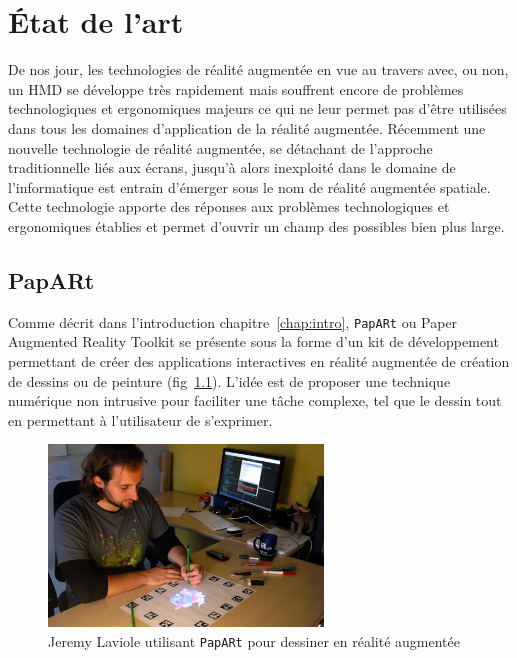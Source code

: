 \chapter{État de l'art}

De nos jour, les technologies de réalité augmentée en vue au travers avec, ou non, un HMD se développe très rapidement mais souffrent encore de problèmes technologiques et ergonomiques majeurs ce qui ne leur permet pas d'être utilisées dans tous les domaines d'application de la réalité augmentée\cite{li2017state}. Récemment une nouvelle technologie de réalité augmentée, se détachant de l'approche traditionnelle liés aux écrans, jusqu'à alors inexploité dans le domaine de l'informatique est entrain d'émerger sous le nom de réalité augmentée spatiale. Cette technologie apporte des réponses aux problèmes technologiques et ergonomiques établies et permet d'ouvrir un champ des possibles bien plus large\cite{bimber2006modern}.

\section{PapARt}
\label{sec:papart}
Comme décrit dans l'introduction chapitre~\ref{chap:intro}, \texttt{PapARt} ou Paper Augmented Reality Toolkit se présente sous la forme d'un kit de développement permettant de créer des applications interactives en réalité augmentée de création de dessins ou de peinture (fig~\ref{fig:papartdemo}). L'idée est de proposer une technique numérique non intrusive pour faciliter une tâche complexe, tel que le dessin tout en permettant à l'utilisateur de s'exprimer\cite{laviole2012papart}.
\begin{figure}[H]
\centering
\includegraphics[width=0.65\textwidth]{images/papart-demo}
\caption{Jeremy Laviole utilisant \texttt{PapARt} pour dessiner en réalité augmentée\protect\footnotemark}
\label{fig:papartdemo}
\end{figure}

